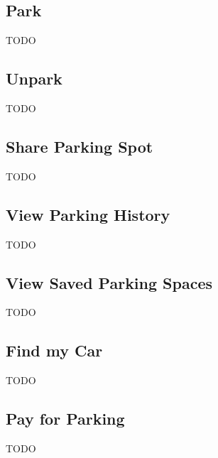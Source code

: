 \documentclass[11pt]{article}
\begin{document}
\subsection{Park}
TODO

\subsection{Unpark}
TODO

\subsection{Share Parking Spot}
TODO

\subsection{View Parking History}
TODO

\subsection{View Saved Parking Spaces}
TODO

\subsection{Find my Car}
TODO



\subsection{Pay for Parking}
TODO
\end{document}

